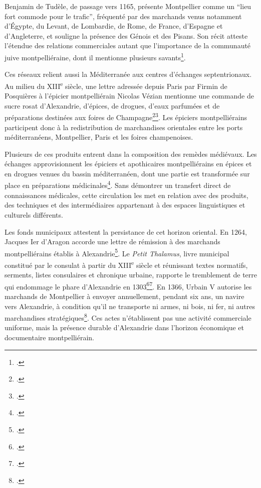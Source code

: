 Benjamin de Tudèle, de passage vers 1165, présente Montpellier comme un \enquote{lieu fort commode pour le trafic}, fréquenté par des marchands venus notamment d'Égypte, du Levant, de Lombardie, de Rome, de France, d'Espagne et d'Angleterre, et souligne la présence des Génois et des Pisans. Son récit atteste l'étendue des relations commerciales autant que l'importance de la communauté juive montpelliéraine, dont il mentionne plusieurs savants\footcite[p.~7, vue~16/512 de la version numérisée]{BenjaminTudele1830}.

Ces réseaux relient aussi la Méditerranée aux centres d'échanges septentrionaux. Au milieu du XIII\textsuperscript{e} siècle, une lettre adressée depuis Paris par Firmin de Posquières à l'épicier montpelliérain Nicolas Vézian mentionne une commande de sucre rosat d'Alexandrie, d'épices, de drogues, d'eaux parfumées et de préparations destinées aux foires de Champagne\footcite{MontpellierAMEE289}\footcite{Bach2020}. Les épiciers montpelliérains participent donc à la redistribution de marchandises orientales entre les ports méditerranéens, Montpellier, Paris et les foires champenoises.

Plusieurs de ces produits entrent dans la composition des remèdes médiévaux. Les échanges approvisionnent les épiciers et apothicaires montpelliérains en épices et en drogues venues du bassin méditerranéen, dont une partie est transformée sur place en préparations médicinales\footcite{Irissou1947}. Sans démontrer un transfert direct de connaissances médicales, cette circulation les met en relation avec des produits, des techniques et des intermédiaires appartenant à des espaces linguistiques et culturels différents.

Les fonds municipaux attestent la persistance de cet horizon oriental. En 1264, Jacques Ier d'Aragon accorde une lettre de rémission à des marchands montpelliérains établis à Alexandrie\footcite{MontpellierAMLouvet4247}. Le \emph{Petit Thalamus}, livre municipal constitué par le consulat à partir du XIII\textsuperscript{e} siècle et réunissant textes normatifs, serments, listes consulaires et chronique urbaine, rapporte le tremblement de terre qui endommage le phare d'Alexandrie en 1303\footcite[fol.~25 ; vue~55/1140 de la version numérisée]{MontpellierAMAA9}\footcite{Chastang2013Montpellier}. En 1366, Urbain V autorise les marchands de Montpellier à envoyer annuellement, pendant six ans, un navire vers Alexandrie, à condition qu'il ne transporte ni armes, ni bois, ni fer, ni autres marchandises stratégiques\footcite{MontpellierAMLouvet2799}. Ces actes n'établissent pas une activité commerciale uniforme, mais la présence durable d'Alexandrie dans l'horizon économique et documentaire montpelliérain.

